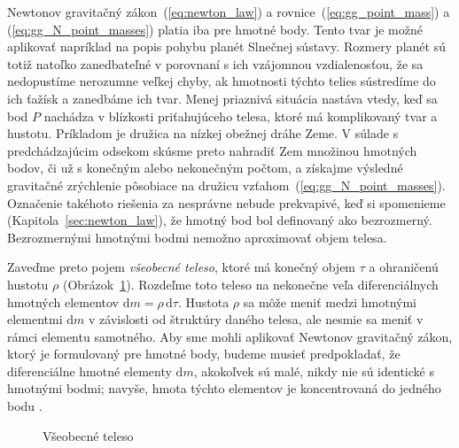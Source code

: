 \documentclass[a4paper, 12pt]{book}
\newcommand{\diff}{\mathrm d}
\begin{document}
Newtonov gravitačný zákon~(\ref{eq:newton_law}) 
a rovnice~(\ref{eq:gg_point_mass}) 
a (\ref{eq:gg_N_point_masses}) platia iba pre hmotné body.  
Tento tvar je možné aplikovať napríklad na popis pohybu planét Slnečnej 
sústavy.  Rozmery planét sú totiž natoľko zanedbateľné v porovnaní s ich 
vzájomnou vzdialenosťou, že sa nedopustíme nerozumne veľkej chyby, ak hmotnosti 
týchto telies sústredíme do ich ťažísk a zanedbáme ich tvar.  Menej priaznivá 
situácia nastáva vtedy, keď sa bod $P$ nachádza v blízkosti priťahujúceho 
telesa, ktoré má komplikovaný tvar a hustotu.  Príkladom je družica na nízkej 
obežnej dráhe Zeme.  V súlade s predchádzajúcim odsekom skúsme preto nahradiť 
Zem množinou hmotných bodov, či už s konečným alebo nekonečným počtom, 
a získajme výsledné gravitačné zrýchlenie pôsobiace na družicu 
vzťahom~(\ref{eq:gg_N_point_masses}).  Označenie takéhoto 
riešenia za nesprávne nebude prekvapivé, keď si spomenieme 
(Kapitola~\ref{sec:newton_law}), že hmotný bod bol definovaný 
ako bezrozmerný.  Bezrozmernými hmotnými bodmi nemožno aproximovať objem 
telesa.

Zaveďme preto pojem \emph{všeobecné teleso}, ktoré má konečný objem $\tau$ 
a ohraničenú hustotu $\rho$ (Obrázok~\ref{fig:gravitating_body}).  Rozdeľme 
toto teleso na nekonečne veľa diferenciálnych hmotných elementov $\diff 
m = \rho \, \diff \tau$.  Hustota $\rho$ sa môže meniť medzi hmotnými elementmi 
$\diff m$ v závislosti od štruktúry daného telesa, ale nesmie sa meniť v rámci 
elementu samotného.  Aby sme mohli aplikovať Newtonov gravitačný zákon, ktorý 
je formulovaný pre hmotné body, budeme musieť predpokladať, že diferenciálne 
hmotné elementy $\diff m$, akokoľvek sú malé, nikdy nie sú identické s hmotnými 
bodmi; navyše, hmota týchto elementov je koncentrovaná do jedného bodu 
\citep{Kellogg1967}.

\begin{figure}
\centering

\caption{Všeobecné teleso}
\label{fig:gravitating_body}
\end{figure}
\end{document}
